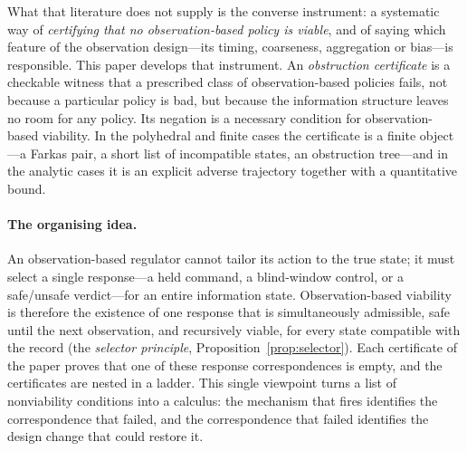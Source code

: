 What that literature does not supply is the converse instrument: a systematic way of \emph{certifying that no observation-based policy is viable}, and of saying which feature of the observation design---its timing, coarseness, aggregation or bias---is responsible. This paper develops that instrument. An \emph{obstruction certificate} is a checkable witness that a prescribed class of observation-based policies fails, not because a particular policy is bad, but because the information structure leaves no room for any policy. Its negation is a necessary condition for observation-based viability. In the polyhedral and finite cases the certificate is a finite object---a Farkas pair, a short list of incompatible states, an obstruction tree---and in the analytic cases it is an explicit adverse trajectory together with a quantitative bound.

\paragraph{The organising idea.} An observation-based regulator cannot tailor its action to the true state; it must select a single response---a held command, a blind-window control, or a safe/unsafe verdict---for an entire information state. Observation-based viability is therefore the existence of one response that is simultaneously admissible, safe until the next observation, and recursively viable, for every state compatible with the record (the \emph{selector principle}, Proposition~\ref{prop:selector}). Each certificate of the paper proves that one of these response correspondences is empty, and the certificates are nested in a ladder. This single viewpoint turns a list of nonviability conditions into a calculus: the mechanism that fires identifies the correspondence that failed, and the correspondence that failed identifies the design change that could restore it.

